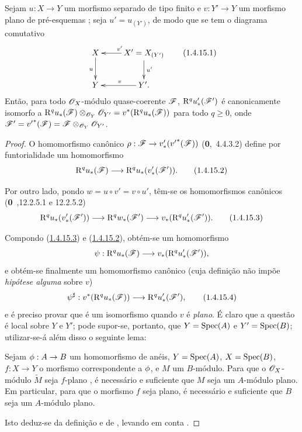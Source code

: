 \begin{proposition}[1.4.15]
\label{III.1.4.15}
Sejam $u:X\to Y$ um morfismo separado de tipo finito e $v:Y'\to Y$ um morfismo plano de pré-esquemas ; seja $u'=u_{(Y')}$, de modo que se tem o diagrama comutativo
\[
  \xymatrix{
    X\ar[d]_u &
    X'=X_{(Y')}\ar[l]_{v'}\ar[d]^{u'}\\
    Y &
    Y'\ar[l]_{v}.
  }
  \tag{1.4.15.1}
  \label{III.1.4.15.1}
\]
Então, para todo $\mathscr{O}_X$-módulo quase-coerente $\mathscr{F}$, $\mathrm{R}^q u_*'(\mathscr{F}')$ é canonicamente isomorfo a $\mathrm{R}^q u_*(\mathscr{F})\otimes_{\mathscr{O}_Y}\mathscr{O}_{Y'}=v^*(\mathrm{R}^q u_*(\mathscr{F}))$ para todo $q\geq 0$, onde $\mathscr{F}'={v'}^*(\mathscr{F})=\mathscr{F}\otimes_{\mathscr{O}_Y}\mathscr{O}_{Y'}$.
\end{proposition}

\begin{proof}
O homomorfismo canônico $\rho:\sh{F}\to v_*'({v'}^*(\sh{F}))$ (\textbf{0},~4.4.3.2) define por funtorialidade um homomorfismo
\[
  \RR^q u_*(\sh{F})\to\RR^q u_*(v_*'(\sh{F}')).
  \tag{1.4.15.2}\label{III.1.4.15.2}
\]

Por outro lado, pondo $w=u\circ v'=v\circ u'$, têm-se os homomorfismos canônicos (\textbf{0}~,12.2.5.1 e 12.2.5.2)
\[
  \RR^q u_*(v_*'(\sh{F}'))\to\RR^q w_*(\sh{F}')\to v_*(\RR^q u_*'(\sh{F}')).
  \tag{1.4.15.3}\label{III.1.4.15.3}
\]

Compondo (\hyperref[III.1.4.15.3]{1.4.15.3}) e (\hyperref[III.1.4.15.2]{1.4.15.2}), obtém-se um homomorfismo
\[
  \psi:\RR^q u_*(\sh{F})\to v_*(\RR^q u_*'(\sh{F}')),
\]
e obtém-se finalmente um homomorfismo canônico (cuja definição não impõe \emph{hipótese alguma} sobre $v$)
\[
  \psi^\sharp:v^*(\RR^q u_*(\sh{F}))\to\RR^q u_*'(\sh{F}'),
  \tag{1.4.15.4}
\]
e é preciso provar que é um isomorfismo quando $v$ é \emph{plano}.
É claro que a questão é local sobre $Y$ e $Y'$; pode supor-se, portanto, que $Y=\operatorname{Spec}(A)$ e $Y'=\operatorname{Spec}(B)$; utilizar-se-á além disso o seguinte lema:
\begin{lemma}[1.4.15.5]
\label{III.1.4.15.5}
Sejam $\vphi:A\to B$ um homomorfismo de anéis, $Y=\operatorname{Spec}(A)$, $X=\operatorname{Spec}(B)$, $f:X\to Y$ o morfismo correspondente a $\phi$, e $M$ um $B$-módulo.
Para que o $\mathscr{O}_X$-módulo $\widetilde{M}$ seja $f$-plano , é necessário e suficiente que $M$ seja um $A$-módulo plano.
Em particular, para que o morfismo $f$ seja plano, é necessário e suficiente que $B$ seja um $A$-módulo plano.
\end{lemma}

Isto deduz-se da definição  e de , levando em conta .


\end{proof}
